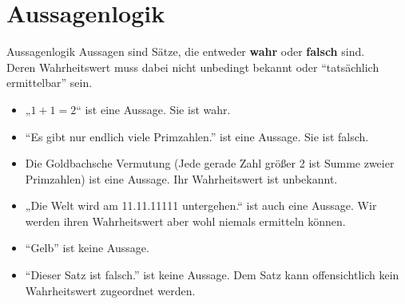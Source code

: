 \section{Aussagenlogik}


\begin{frame}{Aussagenlogik}
	Aussagen sind Sätze, die entweder \textbf{wahr} oder \textbf{falsch} sind.\\
	Deren Wahrheitswert muss dabei nicht unbedingt bekannt oder \enquote{tatsächlich ermittelbar} sein.
	
	\pause
	\begin{Beispiel}
		\begin{itemize}
			\item „$ 1 + 1 = 2 $“ ist eine Aussage. Sie ist wahr.
			\item \enquote{Es gibt nur endlich viele Primzahlen.} ist eine Aussage. Sie ist falsch.
			\pause
			\item Die Goldbachsche Vermutung (Jede gerade Zahl größer 2 ist Summe zweier Primzahlen) \pause ist eine Aussage. Ihr Wahrheitswert ist unbekannt.
			\pause
			\item „Die Welt wird am 11.11.11111 untergehen.“ \pause ist auch eine Aussage. Wir werden ihren Wahrheitswert aber wohl niemals ermitteln können.
			\pause
			\item \enquote{Gelb} ist keine Aussage.
			\pause
			\item \enquote{Dieser Satz ist falsch.} \pause ist keine Aussage. Dem Satz kann offensichtlich kein Wahrheitswert zugeordnet werden.
		\end{itemize}
	\end{Beispiel}
\end{frame}

